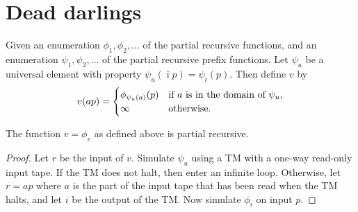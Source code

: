 \documentclass{style/llncs}
\newcommand{\tn}[1]{\textnormal{#1}}
\begin{document}
\appendix
\section{Dead darlings}

\begin{definition}
Given an enumeration $\phi_1,\phi_2,\ldots$ of the partial recursive functions, and an enumeration $\psi_1,\psi_2,\ldots$ of the partial recursive prefix functions. Let $\psi_u$ be a universal element with property $\psi_u(\bar\imath p)=\psi_i(p)$. Then define $v$ by
\[
v(a p)=\begin{cases}\phi_{\psi_u(a)}(p)&\tn{if $a$ is in the domain of $\psi_u$,}\\
\infty&\tn{otherwise}.\end{cases}
\]
\end{definition}
\begin{lemma}
The function $v=\phi_v$ as defined above is partial recursive.
\end{lemma}
\begin{proof}
Let $r$ be the input of $v$. Simulate $\psi_u$ using a TM with a one-way read-only input tape. If the TM does not halt, then enter an infinite loop. Otherwise, let $r=ap$ where $a$ is the part of the input tape that has been read when the TM halts, and let $i$ be the output of the TM. Now simulate $\phi_i$ on input $p$.
\end{proof}
\end{document}
